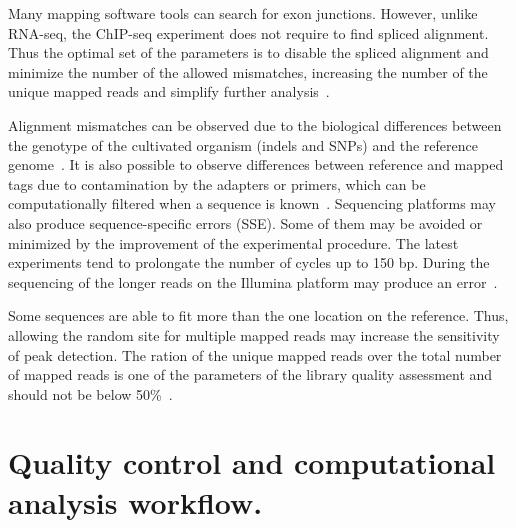 Many mapping software tools can search for exon junctions. 
However, unlike RNA-seq, the ChIP-seq experiment does not require to find spliced alignment.
Thus the optimal set of the parameters is to disable the spliced alignment and minimize the number of the allowed mismatches, increasing the number of the unique mapped reads and simplify further analysis~\cite{derrien2012fast}.

Alignment mismatches can be observed due to the biological differences between the genotype of the cultivated organism (indels and SNPs) and the reference genome~\cite{park2009chip}.
It is also possible to observe differences between reference and mapped tags due to contamination by the adapters or primers, which can be computationally filtered when a sequence is known~\cite{nakamura2011sequence}. 
Sequencing platforms may also produce sequence-specific errors (SSE). Some of them may be avoided or minimized by the improvement of the experimental procedure. The latest experiments tend to prolongate the number of cycles up to 150 bp. During the sequencing of the longer reads on the Illumina platform may produce an error~\cite{nakamura2011sequence}.

Some sequences are able to fit more than the one location on the reference. Thus, allowing the random site for multiple mapped reads may increase the sensitivity of peak detection. 
The ration of the unique mapped reads over the total number of mapped reads is one of the parameters of the library quality assessment and should not be below 50\%~\cite{shin2013computational}.













\section{Quality control and computational analysis workflow.}


